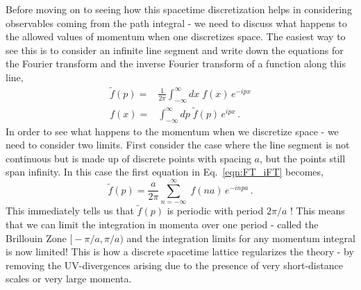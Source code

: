 \documentclass[11pt]{article}
\newcommand{\sideex}[1]{\marginnote{\footnotesize\textcolor{red!50!black}{#1}}}
\theoremstyle{definition}
\begin{document}
Before moving on to seeing how this spacetime discretization helps in considering observables coming from the path integral - we need to discuss what happens to the allowed values of momentum when one discretizes space. The easiest way to see this is to consider an infinite line segment and write down the equations for the Fourier transform and the inverse Fourier transform of a function along this line,
\begin{align}\label{eqn:FT_iFT}
  \tilde{f}(p) =& \frac{1}{2 \pi}\int^{\infty}_{-\infty} dx \; f(x) \, e^{-ipx} \nonumber \\
  f(x) =& \int^{\infty}_{-\infty} dp \; \tilde{f}(p)\, e^{ipx} \,.
\end{align}
In order to see what happens to the momentum when we discretize space \sideex{There is an exercise related to this!} - we need to consider two limits.
First consider the case where the line segment is not continuous but is made up of discrete points with spacing $a$, but the points still span infinity. In this case the first equation in Eq.~\eqref{eqn:FT_iFT} becomes,
\begin{equation}
  \tilde{f}(p) = \frac{a}{2 \pi} \displaystyle\sum_{n=-\infty}^{\infty} \; f(na) \, e^{-inpa} \,.
\end{equation}
This immediately tells us that $\tilde{f}(p)$ is periodic with period $2\pi/a$ ! This means that we can limit the integration in momenta over one period - called the Brillouin Zone $\bigl[-\pi/a , \pi/a \bigr)$ and the integration limits for any momentum integral is now limited! This is how a discrete spacetime lattice regularizes the theory - by removing the UV-divergences arising due to the presence of very short-distance scales or very large momenta. 
\end{document}
